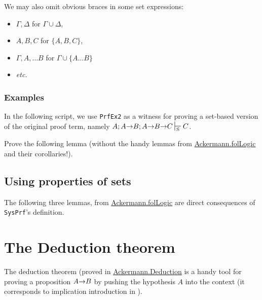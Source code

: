 We may also omit obvious braces in some set expressions:


\begin{itemize}

\item $\Gamma, \Delta$ for $\Gamma\cup\Delta$,
\item $A, B, C$ for $\{A, B, C\}$,
\item $\Gamma, A,\dots B$ for $\Gamma\cup\{A \dots B\}$
\item \emph{etc.}
\end{itemize}

\subsubsection{Examples}


In the following script, we use \texttt{PrfEx2}
as a witness for proving a set-based version of the 
original proof term, namely $A; A \arrow B; A \arrow B \arrow C \sdash C$.





\begin{exercise}

Prove the following lemma (without the handy lemmas from
\href{../theories/html/hydras.Ackermann.folLogic.html}{Ackermann.folLogic} and their corollaries!).


\end{exercise}

\subsection{Using properties of sets}

The following three lemmas, from 
\href{../theories/html/hydras.Ackermann.folLogic.html}{Ackermann.folLogic} are direct consequences of \texttt{SysPrf}'s definition. 






\section{The Deduction theorem}

The deduction theorem (proved in \href{../theories/html/hydras.Ackermann.Deduction.html}{Ackermann.Deduction} is a handy 
tool for proving a proposition $A\mbox{$\rightarrow$} B$ by pushing 
the hypothesis $A$ into the context (it corresponds to 
implication introduction in \coq).


